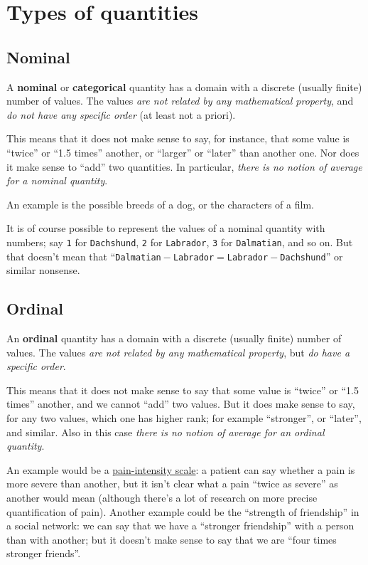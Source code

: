 \documentclass[
  a4paper,
  DIV=11,
  numbers=noendperiod,
  oneside]{scrreprt}
\begin{document}
\hypertarget{types-of-quantities}{%
\section{Types of quantities}\label{types-of-quantities}}

\hypertarget{nominal}{%
\subsection{Nominal}\label{nominal}}

A {\textbf{nominal}} or {\textbf{categorical}} quantity has a domain
with a discrete (usually finite) number of values. The values {\emph{are
not related by any mathematical property}}, and {\emph{do not have any
specific order}} (at least not a priori).

This means that it does not make sense to say, for instance, that some
value is ``twice'' or ``1.5 times'' another, or ``larger'' or ``later''
than another one. Nor does it make sense to ``add'' two quantities. In
particular, {\emph{there is no notion of average for a nominal
quantity}}.

An example is the possible breeds of a dog, or the characters of a film.

It is of course possible to represent the values of a nominal quantity
with numbers; say \texttt{1} for \texttt{Dachshund}, \texttt{2} for
\texttt{Labrador}, \texttt{3} for \texttt{Dalmatian}, and so on. But
that doesn't mean that
``\texttt{Dalmatian}\({}-{}\)\texttt{Labrador}\({}={}\)\texttt{Labrador}\({}-{}\)\texttt{Dachshund}''
or similar nonsense.

\hypertarget{ordinal}{%
\subsection{Ordinal}\label{ordinal}}

An {\textbf{ordinal}} quantity has a domain with a discrete (usually
finite) number of values. The values {\emph{are not related by any
mathematical property}}, but {\emph{do have a specific order}}.

This means that it does not make sense to say that some value is
``twice'' or ``1.5 times'' another, and we cannot ``add'' two values.
But it does make sense to say, for any two values, which one has higher
rank; for example ``stronger'', or ``later'', and similar. Also in this
case {\emph{there is no notion of average for an ordinal quantity}}.

An example would be a
\href{https://doi.org/10.1016/j.jpainsymman.2004.08.007}{pain-intensity
scale}: a patient can say whether a pain is more severe than another,
but it isn't clear what a pain ``twice as severe'' as another would mean
(although there's a lot of research on more precise quantification of
pain). Another example could be the ``strength of friendship'' in a
social network: we can say that we have a ``stronger friendship'' with a
person than with another; but it doesn't make sense to say that we are
``four times stronger friends''.
\end{document}
